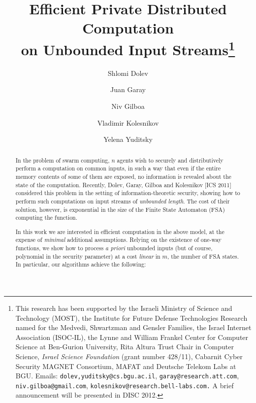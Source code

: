 \documentclass[letterpaper,11pt]{article}
\begin{document}
\begin{titlepage}

\title{\bf Efficient Private Distributed Computation \\
on Unbounded Input Streams\thanks{This research has been supported by the Israeli Ministry of Science and Technology (MOST), the Institute for Future Defense Technologies Research named for the Medvedi, Shwartzman and Gensler Families, the Israel Internet Association (ISOC-IL), the Lynne and William Frankel Center for Computer Science at Ben-Gurion University, Rita Altura Trust Chair in Computer Science, {\em Israel Science Foundation} (grant number 428/11), Cabarnit Cyber Security MAGNET Consortium, MAFAT and Deutsche Telekom Labs at BGU. Emails: {\tt {dolev,yuditsky}\allowbreak @cs.bgu.ac.il}, {\tt garay@\allowbreak research.\allowbreak att.com}, {\tt niv.gilboa@gmail.com}, {\tt kolesnikov@\allowbreak research.bell-labs.com.} A brief announcement will be presented in DISC 2012.}}

\author[1]{Shlomi Dolev}
\author[2]{Juan Garay}
\author[3]{Niv Gilboa}
\author[4]{Vladimir Kolesnikov}
\author[1]{Yelena Yuditsky}





\date{}


\maketitle
\thispagestyle{empty}
\begin{abstract}
In the problem of swarm computing, $n$ agents wish to securely and
distributively perform a computation on common inputs, in such a way
that even if the entire memory contents of some of them are exposed,
no information is revealed about the state of the computation.
Recently, Dolev, Garay, Gilboa and Kolesnikov [ICS 2011] considered this
problem in the setting of information-theoretic security, showing how to perform such computations on input streams of {\em unbounded length}.  The cost of their solution, however, is exponential in the size of the Finite State Automaton (FSA) computing the function.

In this work we are interested in efficient computation in the above
model, at the expense of {\em minimal} additional assumptions. Relying on the existence of one-way functions, we show how to process {\it a priori} unbounded inputs (but of course, polynomial in the security parameter) at a cost {\em linear} in $m$, the number of FSA states. In particular, our algorithms
achieve the following: 


\end{abstract}
\end{titlepage}
\end{document}
